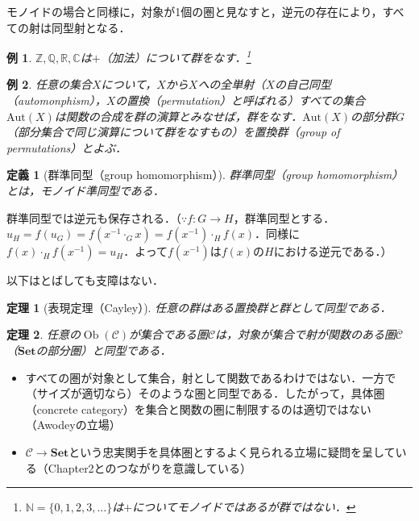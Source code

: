 \documentclass[dvipdfmx,a4j,10pt]{jsarticle}
\theoremstyle{mystyle1}
\theoremstyle{mystyle2}
\newtheorem{dfn*}{定義}
\newtheorem{thm*}{定理}
\newtheorem{example}{例}
\DeclareMathOperator{\Ob}{Ob}
\def\startpoint#1{
    {\hfill\rlap{{$\overline{\tt{#1}\ \downarrow\ }$}}}\vspace{-1.5\baselineskip}
}
\begin{document}
モノイドの場合と同様に，対象が1個の圏と見なすと，逆元の存在により，すべての射は同型射となる．

\begin{example}
	$\mathbb{Z},\mathbb{Q},\mathbb{R},\mathbb{C}$は$+$（加法）について群をなす．\footnote{$\mathbb{N}=\{0,1,2,3,\ldots\}$は$+$についてモノイドではあるが群ではない．}
\end{example}

\begin{example}
	任意の集合$X$について，$X$から$X$への全単射（$X$の自己同型（automonphism），$X$の置換（permutation）と呼ばれる）すべての集合$\mathrm{Aut}(X)$は関数の合成を群の演算とみなせば，群をなす．$\mathrm{Aut}(X)$の部分群$G$（部分集合で同じ演算について群をなすもの）を置換群（group of permutations）とよぶ．
\end{example}

\begin{dfn*}[群準同型（group homomorphism）]
	群準同型（group homomorphism）とは，モノイド準同型である．
\end{dfn*}

群準同型では逆元も保存される．（$\because$$f:G\to H$，群準同型とする．$u_H=f(u_G)=f(x^{-1}\cdot_G x)=f(x^{-1})\cdot_H f(x)$．同様に$f(x)\cdot_H f(x^{-1})=u_H$．よって$f(x^{-1})$は$f(x)$の$H$における逆元である．）

	以下はとばしても支障はない．
	\begin{thm*}[表現定理（Cayley）]
		任意の群はある置換群と群として同型である．
	\end{thm*}

	\begin{thm*}
		任意の$\Ob(\mathcal{C})$が集合である圏$\mathcal{C}$は，対象が集合で射が関数のある圏$\overline{\mathcal{C}}$（$\mathbf{Set}$の部分圏）と同型である．
	\end{thm*}

	\begin{itemize}
		\item すべての圏が対象として集合，射として関数であるわけではない．一方で（サイズが適切なら）そのような圏と同型である．したがって，具体圏（concrete category）を集合と関数の圏に制限するのは適切ではない（Awodeyの立場）
		\item $\mathcal{C}\to\mathbf{Set}$という忠実関手を具体圏とするよく見られる立場に疑問を呈している（Chapter2とのつながりを意識している）
	\end{itemize}


	\startpoint{5/10(第4回)}
\end{document}
